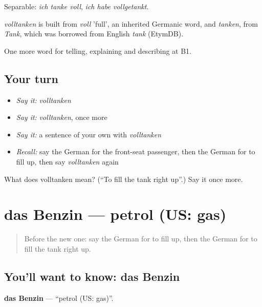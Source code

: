 Separable: \emph{ich tanke voll}, \emph{ich habe vollgetankt}.

\begin{cousinweb}
\emph{volltanken} is built from \emph{voll} 'full', an inherited Germanic word, and \emph{tanken}, from \emph{Tank}, which was borrowed from English \emph{tank} (EtymDB).
\end{cousinweb}

\begin{grammarlens}[title={What you've built}]
One more word for telling, explaining and describing at B1.
\end{grammarlens}

\subsection*{Your turn}
\begin{itemize}
\raggedright
  \item \emph{Say it:} \emph{volltanken}
  \item \emph{Say it:} \emph{volltanken}, once more
  \item \emph{Say it:} a sentence of your own with \emph{volltanken}
  \item \emph{Recall:} say the German for the front-seat passenger, then the German for to fill up, then say \emph{volltanken} again
\end{itemize}

\begin{tcolorbox}[breakable,colback=teal!4,colframe=teal!35!black,title={Before you move on}]
What does volltanken mean? (\textquotedblleft{}To fill the tank right up\textquotedblright{}.) Say it once more.
\end{tcolorbox}
\section[das Benzin]{das Benzin — petrol (US: gas)}

\label{lesson:GE-C402-benzin}



\begin{quote}
Before the new one: say the German for to fill up, then the German for to fill the tank right up.
\end{quote}

\subsection*{You'll want to know: das Benzin}
\textbf{das Benzin} — \textquotedblleft{}petrol (US: gas)\textquotedblright{}.

